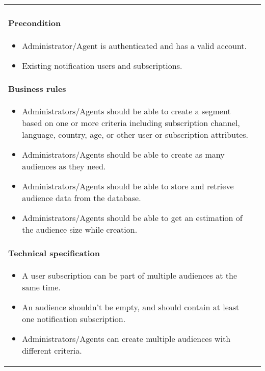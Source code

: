 \begin{longtable}{ | m{} | m{} | }
    \paragraph*{Precondition} \mbox{} \newline
    \begin{itemize}
        \item Administrator/Agent is authenticated and has a valid account.
        \item Existing notification users and subscriptions.
    \end{itemize}
    \paragraph*{Business rules} \mbox{} \newline
    \begin{itemize}
        \item Administrators/Agents should be able to create a segment based on one or more criteria including subscription channel, language, country, age, or other user or subscription attributes.
        \item Administrators/Agents should be able to create as many audiences as they need.
        \item Administrators/Agents should be able to store and retrieve audience data from the database.
        \item Administrators/Agents should be able to get an estimation of the audience size while creation.
    \end{itemize}
    \paragraph*{Technical specification} \mbox{} \newline
    \begin{itemize}
        \item A user subscription can be part of multiple audiences at the same time.
        \item An audience shouldn't be empty, and should contain at least one notification subscription.
        \item Administrators/Agents can create multiple audiences with different criteria.
    \end{itemize}

\end{longtable}
